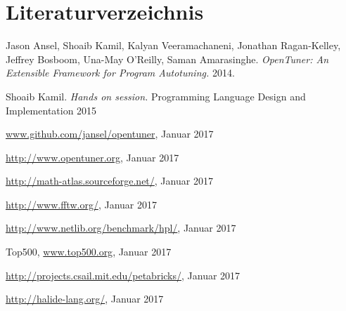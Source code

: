 \documentclass[a4paper,11pt]{scrartcl}
\begin{document}



\section{Literaturverzeichnis}

\begin{thebibliography}{9}
   
  
 Jason Ansel, Shoaib Kamil, Kalyan Veeramachaneni, Jonathan Ragan-Kelley, Jeffrey Bosboom, Una-May O'Reilly, Saman Amarasinghe. \emph{OpenTuner: An Extensible Framework for Program Autotuning.} 2014.

\bibitem{} Shoaib Kamil. \emph{Hands on session.} Programming Language Design and
Implementation 2015

 \url{www.github.com/jansel/opentuner}, Januar 2017

 \url{http://www.opentuner.org}, Januar 2017
   
 \url{http://math-atlas.sourceforge.net/}, Januar 2017

 \url{http://www.fftw.org/}, Januar 2017
    

 \url{http://www.netlib.org/benchmark/hpl/}, Januar 2017

  Top500, \url{www.top500.org}, Januar 2017

  \url{http://projects.csail.mit.edu/petabricks/}, Januar 2017

 \url{http://halide-lang.org/}, Januar 2017

\end{thebibliography}
\end{document}
